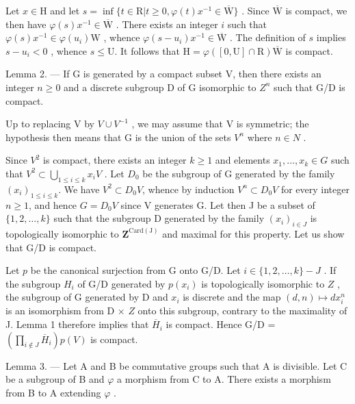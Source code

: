 Let \(x \in \mathrm{H}\) and let \(s = \inf \{t \in \mathrm{R} | t \geqslant 0, \varphi(t)x^{-1} \in \overline{\mathrm{W}}\}\) . Since \(\overline{\mathrm{W}}\) is compact, we then have \(\varphi(s)x^{-1} \in \overline{\mathrm{W}}\) . There exists an integer \(i\) such that \(\varphi(s)x^{-1} \in \varphi(u_i)\mathrm{W}\) , whence \(\varphi(s - u_i)x^{-1} \in \overline{\mathrm{W}}\) . The definition of \(s\) implies \(s - u_i < 0\) , whence \(s \leqslant \mathrm{U}\). It follows that \(\mathrm{H} = \varphi([0,\mathrm{U}] \cap \mathrm{R})\overline{\mathrm{W}}\) is compact.

Lemma 2. --- If G is generated by a compact subset V, then there exists an integer \(n \geqslant 0\) and a discrete subgroup D of G isomorphic to \(Z^{n}\) such that G/D is compact.

Up to replacing V by \(V \cup V^{-1}\) , we may assume that V is symmetric; the hypothesis then means that G is the union of the sets \(V^{n}\) where \(n \in N\) .

Since \(V^{2}\) is compact, there exists an integer \(k \geqslant 1\) and elements \(x_{1}, \ldots, x_{k} \in G\) such that \(V^{2} \subset \bigcup_{1 \leqslant i \leqslant k} x_{i}V\) . Let \(D_{0}\) be the subgroup of G generated by the family \((x_{i})_{1 \leqslant i \leqslant k}\). We have \(V^{2} \subset D_{0}V\), whence by induction \(V^{n} \subset D_{0}V\) for every integer \(n \geqslant 1\), and hence \(G = D_{0}V\) since V generates G. Let then J be a subset of \(\{1, 2, \ldots, k\}\) such that the subgroup D generated by the family \((x_{i})_{i \in J}\) is topologically isomorphic to \(\mathbf{Z}^{\mathrm{Card(J)}}\) and maximal for this property. Let us show that G/D is compact.

Let \(p\) be the canonical surjection from G onto G/D. Let \(i \in \{1, 2, \ldots, k\} - J\) . If the subgroup \(H_i\) of G/D generated by \(p(x_i)\) is topologically isomorphic to \(Z\) , the subgroup of G generated by D and \(x_i\) is discrete and the map \((d, n) \mapsto dx_i^n\) is an isomorphism from D × \(Z\) onto this subgroup, contrary to the maximality of J. Lemma 1 therefore implies that \(\overline{H}_i\) is compact. Hence G/D = \((\prod_{i \not\in J} \overline{H}_i)p(V)\) is compact.

Lemma 3. — Let A and B be commutative groups such that A is divisible. Let C be a subgroup of B and \(\varphi\) a morphism from C to A. There exists a morphism from B to A extending \(\varphi\) .

